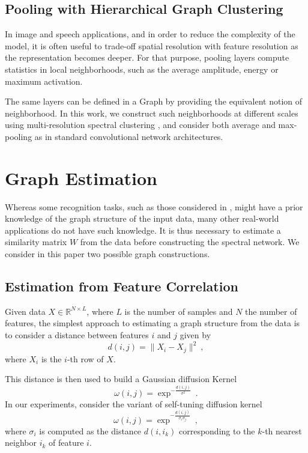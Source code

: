 \documentclass{article} %
\begin{document}
\subsection{Pooling with Hierarchical Graph Clustering}

In image and speech applications, and in order to reduce the complexity of the model, it is often useful to trade-off spatial resolution with feature resolution as the representation becomes deeper. For that purpose, pooling layers compute statistics in local neighborhoods, such as the average amplitude, energy or maximum activation.

The same layers can be defined in a Graph by providing the equivalent notion of neighborhood. In this work, we construct such neighborhoods at different scales using multi-resolution spectral clustering \cite{spectralclustering}, and consider both average and max-pooling as in standard convolutional network architectures.

\section{ Graph Estimation }

Whereas some recognition tasks, such as those considered in \cite{spectralnet2013}, might have a prior knowledge of the graph structure of the input data, many other real-world applications do not have such knowledge. It is thus necessary to estimate a similarity matrix $W$ from the data before constructing the spectral network. 
We consider in this paper two possible graph constructions.

\subsection{ Estimation from Feature Correlation }

Given data $X \in \mathbb{R}^{N \times L}$, where $L$ is the number of samples and $N$ the number of features,
the simplest approach to estimating a graph structure from the data is to consider a distance between features $i$ and $j$ given by
$$d(i,j) = \| X_i - X_j \|^2~,$$
where $X_i$ is the $i$-th row of $X$. 

This distance is then used to build a Gaussian diffusion Kernel \cite{diffusion_maps} 
\begin{equation}
\label{unsupervisedkernel}
\omega(i,j) = \exp^{-\frac{d(i,j)}{\sigma^2}}~.
\end{equation}
In our experiments, consider the variant of self-tuning diffusion kernel \cite{self-tuning}
$$\omega(i,j) = \exp^{-\frac{d(i,j)}{\sigma_i \sigma_j}}~,$$
where $\sigma_i$ is computed as the distance $d(i,i_{k})$ corresponding to the $k$-th nearest neighbor $i_{k}$ of feature $i$. 
\end{document}
